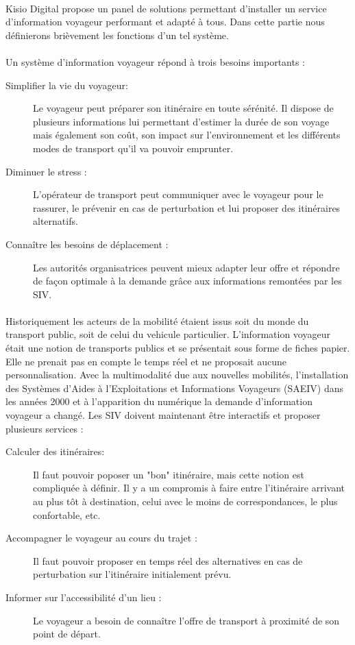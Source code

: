 \documentclass[a4paper]{report}
\begin{document}
\paragraph{} Kisio Digital propose un panel de solutions permettant d'installer un service d'information voyageur performant et adapté à tous. Dans cette partie nous définierons brièvement les fonctions d'un tel système. 

\paragraph{} Un système d'information voyageur répond à trois besoins importants : 
				
\begin{description}
	\item[Simplifier la vie du voyageur:] Le voyageur peut préparer son itinéraire en toute sérénité. Il dispose de plusieurs informations lui permettant d'estimer la durée de son voyage mais également son coût, son impact sur l'environnement et les différents modes de transport qu'il va pouvoir emprunter.
	\item[Diminuer le stress :] L'opérateur de transport peut communiquer avec le voyageur pour le rassurer, le prévenir en cas de perturbation et lui proposer des itinéraires alternatifs.
	\item[Connaître les besoins de déplacement :] Les autorités organisatrices peuvent mieux adapter leur offre et répondre de façon optimale à la demande grâce aux informations remontées par les SIV.
\end{description}

\paragraph{} Historiquement les acteurs de la mobilité étaient issus soit du monde du transport public, soit de celui du vehicule particulier. L'information voyageur était une notion de transports publics et se présentait sous forme de fiches papier. Elle ne prenait pas en compte le temps réel et ne proposait aucune personnalisation. Avec la multimodalité due aux nouvelles mobilités, l'installation des Systèmes d'Aides à l'Exploitations et Informations Voyageurs (SAEIV) dans les années 2000  et à l'apparition du numérique la demande d'information voyageur a changé. Les SIV doivent maintenant être interactifs et proposer plusieurs services :
				
\begin{description}
	\item[Calculer des itinéraires:]  Il faut pouvoir poposer un "bon" itinéraire, mais cette notion est compliquée à définir. Il y a un compromis à faire entre l'itinéraire arrivant au plus tôt à destination, celui avec le moins de correspondances, le plus confortable, etc.
	\item[Accompagner le voyageur au cours du trajet :] Il faut pouvoir proposer en temps réel des alternatives en cas de perturbation sur l'itinéraire initialement prévu.
	\item[Informer sur l'accessibilité d'un lieu :] Le voyageur a besoin de connaître l'offre de transport à proximité de son point de départ.
\end{description}
\end{document}
